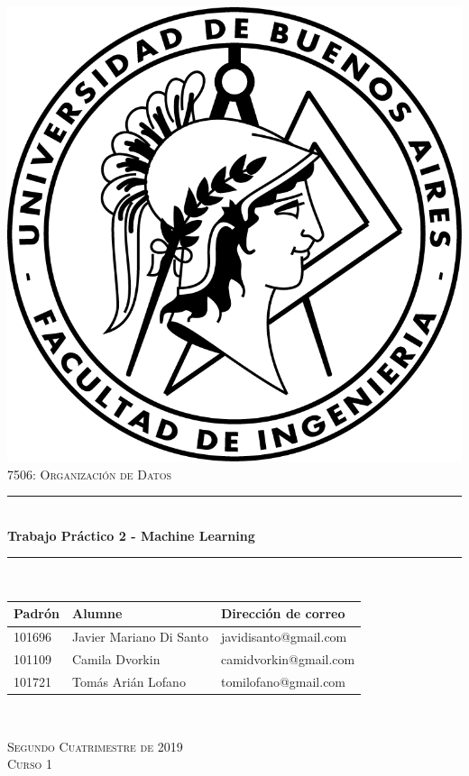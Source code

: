 \documentclass[12pt,a4paper]{article}
\newcommand{\thetitle}{Trabajo Práctico 2 - Machine Learning}
\newcommand{\thedate}{Segundo Cuatrimestre de 2019}
\begin{document}
\begin{titlepage}
\centering
\vspace*{2.5cm}

\includegraphics[scale = 1]{logo_fiuba.png}\\[2.0 cm]

\textsc{\Large 7506: Organización de Datos}\\[0.7 cm]

\rule{0.94\linewidth}{0.2 mm} \\[0.4 cm]
{\huge \bfseries \thetitle}\\
\rule{0.94\linewidth}{0.2 mm} \\[1.2 cm]

\begin{tabular}{lll} %
    \toprule
    Padrón & Alumne & Dirección de correo \\
    \midrule
    101696 & Javier Mariano Di Santo & javidisanto@gmail.com \\
    101109 & Camila Dvorkin & camidvorkin@gmail.com \\
    101721 & Tomás Arián Lofano & tomilofano@gmail.com \\
    \bottomrule
\end{tabular}\\

\vspace*{1cm}

\textsc{\thedate \\[0.1 cm] Curso 1}

\end{titlepage}
\end{document}
